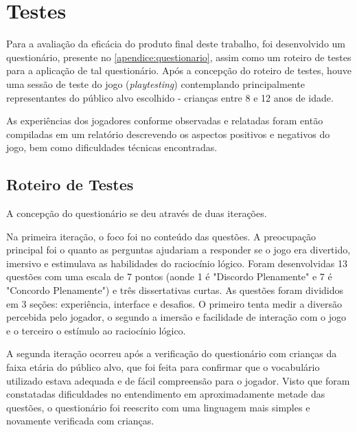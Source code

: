
\chapter{Testes}\label{cap-testes}

Para a avaliação da eficácia do produto final deste trabalho, foi
desenvolvido um questionário, presente no \autoref{apendice:questionario}, 
assim como um roteiro de testes para a aplicação de tal 
questionário. Após a concepção do roteiro de testes, houve 
uma sessão de teste do jogo (\textit{playtesting}) contemplando 
principalmente representantes do público alvo escolhido - crianças 
entre 8 e 12 anos de idade.

As experiências dos jogadores conforme observadas e relatadas foram 
então compiladas em um relatório descrevendo os aspectos positivos e negativos 
do jogo, bem como dificuldades técnicas encontradas.

\section{Roteiro de Testes}\label{sec-roteiro-testes}

A concepção do questionário se deu através de duas iterações.

Na primeira iteração, o foco foi no conteúdo das questões. A 
preocupação principal foi o quanto as perguntas ajudariam a 
responder se o jogo era divertido, imersivo e estimulava as 
habilidades do raciocínio lógico. Foram desenvolvidas 13 questões 
com uma escala de 7 pontos (aonde 1 é "Discordo Plenamente" e 7 
é "Concordo Plenamente") e três dissertativas curtas. As questões 
foram divididos em 3 seções: experiência, interface e desafios. 
O primeiro tenta medir a diversão percebida pelo jogador, o segundo 
a imersão e facilidade de interação com o jogo e o terceiro o 
estímulo ao raciocínio lógico.

A segunda iteração ocorreu após a verificação do questionário com 
crianças da faixa etária do público alvo, que foi feita para 
confirmar que o vocabulário utilizado estava adequada e de fácil 
compreensão para o jogador. Visto que foram constatadas 
dificuldades no entendimento em aproximadamente metade das 
questões, o questionário foi reescrito com uma linguagem mais 
simples e novamente verificada com crianças.

